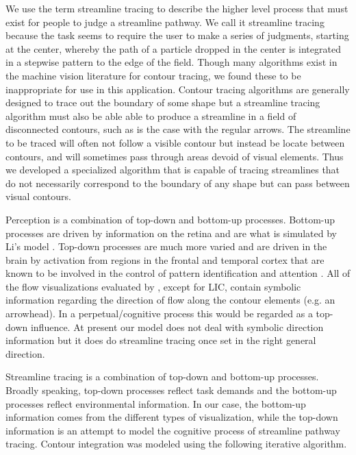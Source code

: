 \documentclass[prodmode,acmtap]{acmlarge}
\begin{document}
We use the term streamline tracing to describe the higher level
process that must exist for people to judge a streamline pathway.
We call it streamline tracing because the task seems to require the
user to make a series of judgments, starting at the center, whereby
the path of a particle dropped in the center is integrated in a
stepwise pattern to the edge of the field. Though many algorithms
exist in the machine vision literature for contour tracing, we found
these to be inappropriate for use in this application. Contour
tracing algorithms are generally designed to trace out the boundary
of some shape but a streamline tracing algorithm must also be able
able to produce a streamline in a field of disconnected contours,
such as is the case with the regular arrows. The streamline to be
traced will often not follow a visible contour but instead be locate
between contours, and will sometimes pass through areas devoid of
visual elements. Thus we developed a specialized algorithm that is
capable of tracing streamlines that do not necessarily correspond to
the boundary of any shape but can pass between visual contours.

Perception is a combination of top-down and bottom-up processes.
Bottom-up processes are driven by information on the retina and are
what is simulated by Li's model \citeyear{Li1998a}. Top-down
processes are much more varied and are driven in the brain by
activation from regions in the frontal and temporal cortex that are
known to be involved in the control of pattern identification and
attention \cite{Lund2001}. All of the flow visualizations evaluated
by , except for LIC, contain symbolic information
regarding the direction of flow along the contour elements (e.g. an
arrowhead). In a perpetual/cognitive process this would be regarded
as a top-down influence. At present our model does not deal with
symbolic direction information but it does do streamline tracing once
set in the right general direction.

Streamline tracing is a combination of top-down and bottom-up
processes. Broadly speaking, top-down processes reflect task demands
and the bottom-up processes reflect environmental information. In our
case, the bottom-up information comes from the different types of
visualization, while the top-down information is an attempt to model
the cognitive process of streamline pathway tracing. Contour
integration was modeled using the following iterative algorithm.
\end{document}
